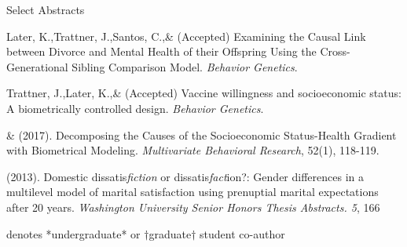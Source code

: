 \begin{rSection}{\textrm{Select Abstracts}}%
\begin{etaremune}

\item Later, K.,\nota Trattner, J.,\nota Santos, C.,\notb \& \meb (Accepted) Examining the Causal Link between Divorce and Mental Health of their Offspring Using the Cross-Generational Sibling Comparison Model. \textit{Behavior Genetics}. 

\item Trattner, J.,\nota Later, K.,\nota \& \meb (Accepted) Vaccine willingness and socioeconomic status: A biometrically controlled design. \textit{Behavior Genetics}. 

\item\meb \& \joe (2017). Decomposing the Causes of the Socioeconomic Status-Health Gradient with Biometrical Modeling. \textit{Multivariate Behavioral Research}, 52(1), 118-119. 

\item\meb (2013). Domestic dissatis{\em fiction} or dissatis{\em fact}ion?: Gender differences in a multilevel model of marital satisfaction using prenuptial marital expectations after 20 years. {\em Washington University Senior Honors Thesis Abstracts. 5}, 166

\vspace{-2mm}\begin{center}\footnotesize{denotes *undergraduate* or $\dagger$graduate$\dagger$ student co-author}\end{center}\vspace{-3mm}
\end{etaremune}
\end{rSection}